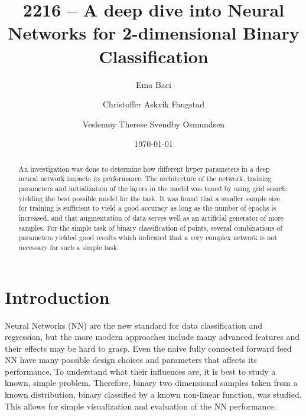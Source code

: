 \documentclass[prl,twocolumn]{revtex4-1}
\begin{document}
\title{2216 -- A deep dive into Neural Networks for 2-dimensional Binary Classification}

\author{Ema Baci}
\author{Christoffer Askvik Faugstad}
\author{Veslemøy Therese Svendby Osmundsen}

\date{\today}

\begin{abstract}
An investigation was done to determine how different hyper parameters in a deep neural network impacts its performance. The architecture of the network, training parameters and initialization of the layers in the model was tuned by using grid search, yielding the best possible model for the task. It was found that a smaller sample size for training is sufficient to yield a good accuracy as long as the number of epochs is increased, and that augmentation of data serves well as an artificial generator of more samples. For the simple task of binary classification of points, several combinations of parameters yielded good results which indicated that a very complex network is not necessary for such a simple task.

\end{abstract}

\maketitle

\section{Introduction}
Neural Networks (NN) are the new standard for data classification and regression, but the more modern approaches include many advanced features and their effects may be hard to grasp. Even the naive fully connected forward feed NN have many possible design choices and parameters that affects its performance. To understand what their influences are, it is best to study a known, simple problem. Therefore, binary two dimensional samples taken from a known distribution, binary classified by a known non-linear function, was studied. This allows for simple visualization and evaluation of the NN performance.

\end{document}
